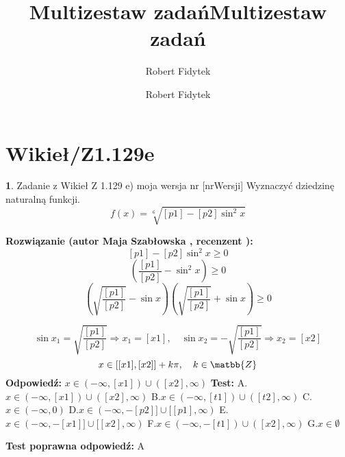 \documentclass[12pt, a4paper]{article}
\title{Multizestaw zadań}
\author{Robert Fidytek}
\date{}\documentclass[12pt, a4paper]{article}
\title{Multizestaw zadań}
\author{Robert Fidytek}
\date{}
\theoremstyle{definition} %
\newtheorem{zad}{}
\theoremstyle{definition} %
\newtheorem{zad}{}
\newcommand{\kategoria}[1]{\section{#1}} %
\newcommand{\zadStart}[1]{\begin{zad}#1\newline} %
\newcommand{\zadStop}{\end{zad}}   %
\newcommand{\rozwStart}[2]{\noindent \textbf{Rozwiązanie (autor #1 , recenzent #2): }\newline} %
\newcommand{\rozwStop}{\newline}                                            %
\newcommand{\odpStart}{\noindent \textbf{Odpowiedź:}\newline}    %
\newcommand{\odpStop}{\newline}                                             %
\newcommand{\testStart}{\noindent \textbf{Test:}\newline} %
\newcommand{\testStop}{\newline} %
\newcommand{\kluczStart}{\noindent \textbf{Test poprawna odpowiedź:}\newline} %
\newcommand{\kluczStop}{\newline} %
\begin{document}
\maketitle


\kategoria{Wikieł/Z1.129e}
\zadStart{Zadanie z Wikieł Z 1.129 e) moja wersja nr [nrWersji]}
Wyznaczyć dziedzinę naturalną funkcji.
$$f(x)=\sqrt[6]{[p1]-[p2]\sin^{2}x}$$

\zadStop

\rozwStart{Maja Szabłowska}{}
$$[p1]-[p2]\sin^{2}x\geq 0$$
$$\left(\frac{[p1]}{[p2]}-\sin^{2} x\right)\geq 0$$
$$\left(\sqrt{\frac{[p1]}{[p2]}}-\sin x\right)\left(\sqrt{\frac{[p1]}{[p2]}}+\sin x\right)\geq 0$$

$$\sin x_{1} =\sqrt{\frac{[p1]}{[p2]}} \Rightarrow x_{1}=[x1], \quad \sin x_{2}=-\sqrt{\frac{[p1]}{[p2]}} \Rightarrow x_{2}=[x2]$$
$$x\in[[x1],[x2]]+k\pi, \quad k\in\matbb{Z}$$
\rozwStop
\odpStart
$x\in(-\infty,[x1])\cup([x2],\infty)$
\odpStop
\testStart
A.$x\in(-\infty,[x1])\cup([x2],\infty)$
B.$x\in(-\infty,[t1])\cup([t2],\infty)$
C.$x\in(-\infty, 0)$
D.$x\in(-\infty, -[p2]] \cup [[p1],\infty)$
E.$x\in(-\infty, -[x1]] \cup [[x2],\infty)$
F.$x\in(-\infty, -[t1]) \cup ([x2],\infty)$
G.$x\in\emptyset$

\testStop
\kluczStart
A
\kluczStop
\end{document}
